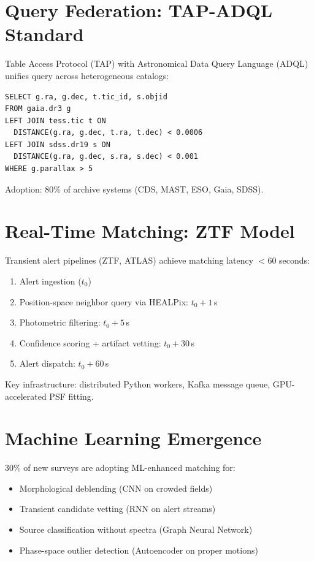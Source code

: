 \documentclass[11pt,twocolumn]{article}
\begin{document}
\section{Query Federation: TAP-ADQL Standard}

Table Access Protocol (TAP) with Astronomical Data Query Language (ADQL) unifies query across heterogeneous catalogs:

\begin{verbatim}
SELECT g.ra, g.dec, t.tic_id, s.objid
FROM gaia.dr3 g
LEFT JOIN tess.tic t ON 
  DISTANCE(g.ra, g.dec, t.ra, t.dec) < 0.0006
LEFT JOIN sdss.dr19 s ON
  DISTANCE(g.ra, g.dec, s.ra, s.dec) < 0.001
WHERE g.parallax > 5
\end{verbatim}

Adoption: 80\% of archive systems (CDS, MAST, ESO, Gaia, SDSS).

\section{Real-Time Matching: ZTF Model}

Transient alert pipelines (ZTF, ATLAS) achieve matching latency $< 60$ seconds:

\begin{enumerate}
\item Alert ingestion ($t_0$)
\item Position-space neighbor query via HEALPix: $t_0 + 1$\,s
\item Photometric filtering: $t_0 + 5$\,s
\item Confidence scoring + artifact vetting: $t_0 + 30$\,s
\item Alert dispatch: $t_0 + 60$\,s
\end{enumerate}

Key infrastructure: distributed Python workers, Kafka message queue, GPU-accelerated PSF fitting.

\section{Machine Learning Emergence}

30\% of new surveys are adopting ML-enhanced matching for:
\begin{itemize}
\item Morphological deblending (CNN on crowded fields)
\item Transient candidate vetting (RNN on alert streams)
\item Source classification without spectra (Graph Neural Network)
\item Phase-space outlier detection (Autoencoder on proper motions)
\end{itemize}
\end{document}
